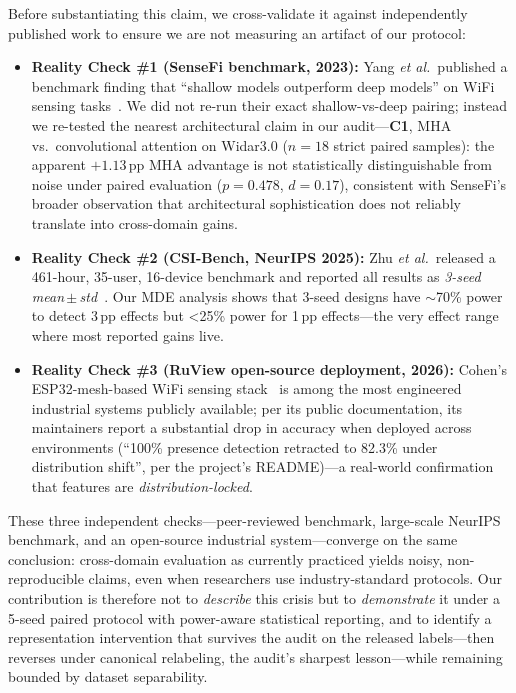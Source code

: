 \documentclass[11pt]{article}
\theoremstyle{definition}
\newcommand{\CSI}{\text{CSI}}
\newcommand{\etal}{\textit{et al.}}
\begin{document}
Before substantiating this claim, we cross-validate it against independently published work to ensure we are not measuring an artifact of our protocol:
\begin{itemize}
    \item \textbf{Reality Check \#1 (SenseFi benchmark, 2023):} Yang \etal\ published a benchmark finding that ``shallow models outperform deep models'' on WiFi sensing tasks~\cite{yang2023sensefi}. We did not re-run their exact shallow-vs-deep pairing; instead we re-tested the nearest architectural claim in our audit---\textbf{C1}, MHA vs.\ convolutional attention on Widar3.0 ($n = 18$ strict paired samples): the apparent $+1.13$\,pp MHA advantage is not statistically distinguishable from noise under paired evaluation ($p = 0.478$, $d = 0.17$), consistent with SenseFi's broader observation that architectural sophistication does not reliably translate into cross-domain gains.
    \item \textbf{Reality Check \#2 (CSI-Bench, NeurIPS 2025):} Zhu \etal\ released a 461-hour, 35-user, 16-device benchmark and reported all results as \emph{3-seed mean\,$\pm$\,std}~\cite{zhu2025csibench}. Our MDE analysis shows that 3-seed designs have $\sim$70\% power to detect 3\,pp effects but \textless 25\% power for 1\,pp effects---the very effect range where most reported gains live.
    \item \textbf{Reality Check \#3 (RuView open-source deployment, 2026):} Cohen's ESP32-mesh-based WiFi sensing stack~\cite{cohen2026ruview} is among the most engineered industrial systems publicly available; per its public documentation, its maintainers report a substantial drop in accuracy when deployed across environments (``100\% presence detection retracted to 82.3\% under distribution shift'', per the project's README)---a real-world confirmation that \CSI{} features are \emph{distribution-locked}.
\end{itemize}

These three independent checks---peer-reviewed benchmark, large-scale NeurIPS benchmark, and an open-source industrial system---converge on the same conclusion: \CSI{} cross-domain evaluation as currently practiced yields noisy, non-reproducible claims, even when researchers use industry-standard protocols. Our contribution is therefore not to \emph{describe} this crisis but to \emph{demonstrate} it under a 5-seed paired protocol with power-aware statistical reporting, and to identify a representation intervention that survives the audit on the released labels---then reverses under canonical relabeling, the audit's sharpest lesson---while remaining bounded by dataset separability.
\end{document}
